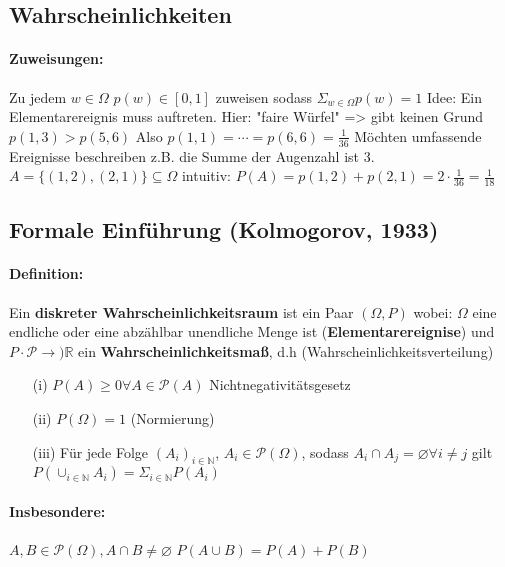 \documentclass{article}
\begin{document}
\subsection*{Wahrscheinlichkeiten}
\paragraph*{Zuweisungen:} Zu jedem \(w \in \Omega\) \(p(w) \in [0, 1]\) zuweisen sodass \(\Sigma_{w \in \Omega} p(w) = 1\)
Idee: Ein Elementarereignis muss auftreten.
Hier: "faire Würfel" => gibt keinen Grund \(p(1,3) > p(5,6)\) 
Also \(p(1,1) = \cdots = p(6,6) = \frac{1}{36}\)
Möchten umfassende Ereignisse beschreiben z.B. die Summe der Augenzahl ist 3.
\(A =\{(1,2), (2,1)\} \subseteq \Omega\)
intuitiv: \(P(A) = p(1,2) + p(2,1) = 2 \cdot \frac{1}{36} = \frac{1}{18}\)

\subsection*{Formale Einführung (Kolmogorov, 1933)}
\paragraph*{Definition:} Ein \textbf{diskreter Wahrscheinlichkeitsraum} ist ein Paar \((\Omega, P)\) wobei: \(\Omega\) eine endliche oder eine abzählbar unendliche Menge ist (\textbf{Elementarereignise}) und \(P \cdot \mathcal{P} \rightarrow)\mathbb{R}\) ein \textbf{Wahrscheinlichkeitsmaß}, d.h (Wahrscheinlichkeitsverteilung)
\begin{itemize}
    \item [(i)] \(P(A) \geq 0 \forall A \in \mathcal{P}(A)\) Nichtnegativitätsgesetz
    \item [(ii)] \(P(\Omega) = 1\) (Normierung)
    \item  [(iii)] Für jede Folge \((A_i)_{i \in \mathbb{N}}\), \(A_i \in \mathcal{P}(\Omega)\), sodass \(A_i \cap A_j = \varnothing \forall i \not = j\) gilt \(P(\cup_{i \in \mathbb{N}} A_i) = \Sigma_{i \in \mathbb{N}} P(A_i)\)
\end{itemize}

\paragraph*{Insbesondere:} \(A, B \in \mathcal{P}(\Omega), A \cap B \not = \varnothing\) \(P(A \cup B) = P(A) + P(B)\)
\end{document}
